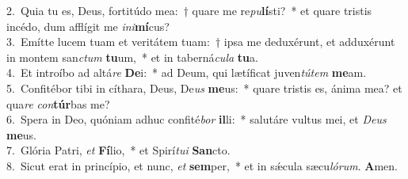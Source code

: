{2.~}Quia tu es, Deus, fortitúdo mea:~† quare me re\textit{pu}\textbf{lí}sti?~* et quare tristis incédo, dum afflígit me \textit{i}\textit{ni}\textbf{mí}cus?\\
{3.~}Emítte lucem tuam et veritátem tuam:~† ipsa me deduxérunt, et adduxérunt in montem san\textit{ctum} \textbf{tu}um,~* et in taberná\textit{cu}\textit{la} \textbf{tu}a.\\
{4.~}Et introíbo ad altá\textit{re} \textbf{De}i:~* ad Deum, qui lætíficat juven\textit{tú}\textit{tem} \textbf{me}am.\\
{5.~}Confitébor tibi in cíthara, Deus, De\textit{us} \textbf{me}us:~* quare tristis es, ánima mea? et qua\textit{re} \textit{con}\textbf{túr}bas me?\\
{6.~}Spera in Deo, quóniam adhuc confité\textit{bor} \textbf{il}li:~* salutáre vultus mei, et \textit{De}\textit{us} \textbf{me}us.\\
{7.~}Glória Patri, \textit{et} \textbf{Fí}lio,~* et Spirí\textit{tu}\textit{i} \textbf{San}cto.\\
{8.~}Sicut erat in princípio, et nunc, \textit{et} \textbf{sem}per,~* et in sǽcula sæcu\textit{ló}\textit{rum}. \textbf{A}men.\\

